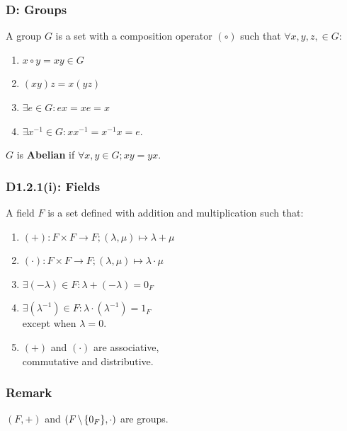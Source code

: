\documentclass{article}
\begin{document}
\begin{multicols*}{3}
\subsubsection*{D: Groups}
A group $G$ is a set with a composition
operator $(\circ)$ such that $\forall x,y,z,\in G$:
\begin{enumerate}
    \item $x\circ y=xy\in G$
    
    \item $(xy)z=x(yz)$
    
    \item $\exists e\in G: ex=xe=x$
    
    \item $\exists x^{-1}\in G: xx^{-1}=x^{-1}x=e$.
\end{enumerate}
$G$ is \textbf{Abelian} if 
$\forall x,y\in G; xy=yx$.

\subsubsection*{D1.2.1(i): Fields}
A field $F$ is a set defined with addition
and multiplication such that:
\begin{enumerate}
    \item $(+):F\times F\rightarrow F;
    (\lambda,\mu)\mapsto\lambda+\mu$

    \item $(\cdot):F\times F\rightarrow F;
    (\lambda,\mu)\mapsto\lambda\cdot\mu$

    \item $\exists (-\lambda)\in F:
    \lambda+(-\lambda)=0_F$

    \item $\exists (\lambda^{-1})\in F:
    \lambda\cdot(\lambda^{-1})=1_F$ \\
    except when $\lambda=0$.

    \item $(+)$ and $(\cdot)$
    are associative, \\ commutative
    and distributive.
\end{enumerate}

\subsubsection*{Remark}
$(F,+)$ and $(F\hspace{0.02in}\backslash
\hspace{0.02in}\{0_F\},\cdot)$ are groups.


\end{multicols*}
\end{document}

